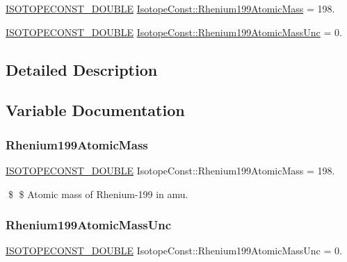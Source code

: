 \begin{DoxyCompactItemize}
\item 
\mbox{\hyperlink{group___isotope_const-_macros_ga8f45a7272ce02c0b4c65c44636ed719a}{I\+S\+O\+T\+O\+P\+E\+C\+O\+N\+S\+T\+\_\+\+D\+O\+U\+B\+LE}} \mbox{\hyperlink{group___isotope_const-_rhenium-_re199_gae7729c494cc296cd607b3322e237ac3d}{Isotope\+Const\+::\+Rhenium199\+Atomic\+Mass}} = 198.
\item 
\mbox{\hyperlink{group___isotope_const-_macros_ga8f45a7272ce02c0b4c65c44636ed719a}{I\+S\+O\+T\+O\+P\+E\+C\+O\+N\+S\+T\+\_\+\+D\+O\+U\+B\+LE}} \mbox{\hyperlink{group___isotope_const-_rhenium-_re199_ga2a18643817e28163111842ff366ccce0}{Isotope\+Const\+::\+Rhenium199\+Atomic\+Mass\+Unc}} = 0.
\end{DoxyCompactItemize}


\subsection{Detailed Description}


\subsection{Variable Documentation}
\mbox{\label{group___isotope_const-_rhenium-_re199_gae7729c494cc296cd607b3322e237ac3d}} 
\subsubsection{\texorpdfstring{Rhenium199\+Atomic\+Mass}{Rhenium199AtomicMass}}
{\footnotesize\ttfamily \mbox{\hyperlink{group___isotope_const-_macros_ga8f45a7272ce02c0b4c65c44636ed719a}{I\+S\+O\+T\+O\+P\+E\+C\+O\+N\+S\+T\+\_\+\+D\+O\+U\+B\+LE}} Isotope\+Const\+::\+Rhenium199\+Atomic\+Mass = 198.}

\$ \$ Atomic mass of Rhenium-\/199 in amu. \mbox{\label{group___isotope_const-_rhenium-_re199_ga2a18643817e28163111842ff366ccce0}} 
\subsubsection{\texorpdfstring{Rhenium199\+Atomic\+Mass\+Unc}{Rhenium199AtomicMassUnc}}
{\footnotesize\ttfamily \mbox{\hyperlink{group___isotope_const-_macros_ga8f45a7272ce02c0b4c65c44636ed719a}{I\+S\+O\+T\+O\+P\+E\+C\+O\+N\+S\+T\+\_\+\+D\+O\+U\+B\+LE}} Isotope\+Const\+::\+Rhenium199\+Atomic\+Mass\+Unc = 0.}

